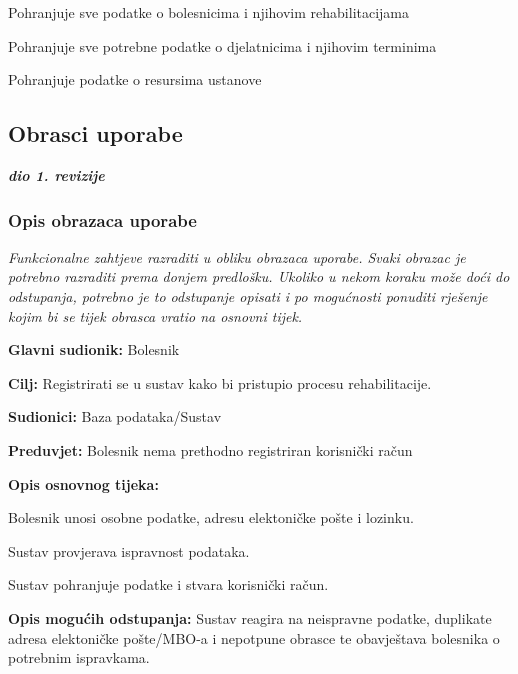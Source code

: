 \begin{packed_enum}
\begin{packed_enum}
	\end{packed_enum}

	\item {}

	\begin{packed_enum}

		\item Pohranjuje sve podatke o bolesnicima i njihovim rehabilitacijama
		\item Pohranjuje sve potrebne podatke o djelatnicima i njihovim terminima
        \item Pohranjuje podatke o resursima ustanove 

	\end{packed_enum}
\end{packed_enum}

\eject



\subsection{Obrasci uporabe}

\textbf{\textit{dio 1. revizije}}

\subsubsection{Opis obrazaca uporabe}
\textit{Funkcionalne zahtjeve razraditi u obliku obrazaca uporabe. Svaki obrazac je potrebno razraditi prema donjem predlošku. Ukoliko u nekom koraku može doći do odstupanja, potrebno je to odstupanje opisati i po mogućnosti ponuditi rješenje kojim bi se tijek obrasca vratio na osnovni tijek.}
\vspace{2em} %

	\item \textbf{Glavni sudionik:} Bolesnik
	\item \textbf{Cilj:} Registrirati se u sustav kako bi pristupio procesu rehabilitacije.
	\item \textbf{Sudionici:} Baza podataka/Sustav
	\item \textbf{Preduvjet:} Bolesnik nema prethodno registriran korisnički račun
	\item \textbf{Opis osnovnog tijeka:}
	\begin{packed_enum}
		\item Bolesnik unosi osobne podatke, adresu elektoničke pošte i lozinku.
		\item Sustav provjerava ispravnost podataka.
		\item Sustav pohranjuje podatke i stvara korisnički račun.
	\end{packed_enum}
	\item \textbf{Opis mogućih odstupanja:}
	Sustav reagira na neispravne podatke, duplikate adresa elektoničke pošte/MBO-a i nepotpune
	obrasce te obavještava bolesnika o potrebnim ispravkama. \\
\closeusecase

